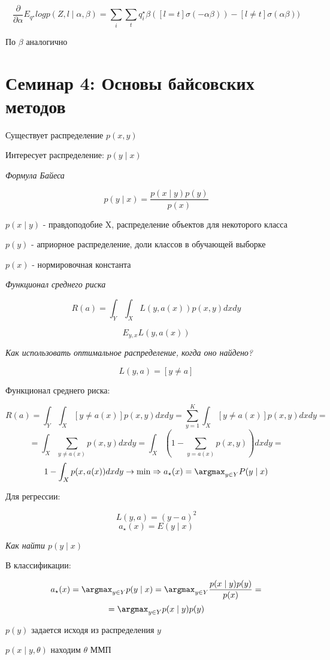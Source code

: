 \documentclass[a4paper, 12pt]{article}
\begin{document}
\[\frac{\partial}{\partial \alpha} E_{q^{\star}} 
log p(Z, l \mid \alpha, \beta) = 
\sum_i \sum_t q_i^{\star} \beta ([l = t]\sigma(-\alpha\beta)) - 
[l \neq t]\sigma(\alpha\beta))\]

По $\beta$ аналогично

\section{Семинар 4: Основы байсовских методов}

Существует распределение $p(x, y)$

Интересует распределение: $p(y \mid x)$

\textit{Формула Байеса}

\[p(y \mid x) = \frac{p(x \mid y)p(y)}{p(x)}\]

$p(x \mid y)$ - правдоподобие X, распределение объектов
для некоторого класса

$p(y)$ - априорное распределение, 
доли классов в обучающей выборке

$p(x)$ - нормировочная константа

\textit{Функционал среднего риска}

\[R(a) = \int_Y \int_X L(y, a(x))p(x, y)dxdy\]

\[E_{y, x}L(y, a(x))\]

\textit{Как использовать оптимальное распределение, 
когда оно найдено?}

\[L(y, a) = [y \neq a]\]

Функционал среднего риска:

\[R(a) = \int_Y \int_X [y \neq a(x)]p(x, y)dxdy 
= \sum_{y = 1}^{K}\int_X[y \neq a(x)]p(x, y)dxdy =\]
\[= \int_X \sum_{y \neq a(x)}p(x, y)dxdy 
= \int_X (1 - \sum_{y = a(x)}p(x, y))dxdy =\]
\[1 - \int_X p(x, a(x))dxdy \rightarrow \min \Rightarrow
a_{\star}(x) = \argmax_{y \in Y} P(y \mid x)\]

Для регрессии:

\[L(y, a) = (y - a)^2\]
\[a_{\star}(x) = E(y \mid x)\]

\textit{Как найти $p(y \mid x)$}

В классификации: 

\[a_{\star}(x) = 
\argmax_{y \in Y} p(y \mid x) = 
\argmax_{y \in Y} \frac{p(x \mid y)p(y)}{p(x)} = \]
\[= \argmax_{y \in Y}p(x \mid y)p(y)\]

$p(y)$ задается исходя из распределения $y$

$p(x \mid y, \theta)$ находим $\theta$ ММП
\newline
\end{document}
